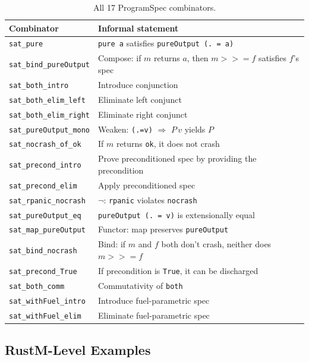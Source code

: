 \begin{table}[t]
\centering
\caption{All 17 ProgramSpec combinators.}
\label{tab:combinators}
\small
\begin{tabular}{@{}ll@{}}
\toprule
\textbf{Combinator} & \textbf{Informal statement} \\
\midrule
\texttt{sat\_pure}              & \texttt{pure a} satisfies \texttt{pureOutput (. = a)} \\
\texttt{sat\_bind\_pureOutput}  & Compose: if $m$ returns $a$, then $m >>= f$ satisfies $f$'s spec \\
\texttt{sat\_both\_intro}       & Introduce conjunction \\
\texttt{sat\_both\_elim\_left}  & Eliminate left conjunct \\
\texttt{sat\_both\_elim\_right} & Eliminate right conjunct \\
\texttt{sat\_pureOutput\_mono}  & Weaken: \texttt{(.=v)} $\Rightarrow$ $P\,v$ yields $P$ \\
\texttt{sat\_nocrash\_of\_ok}   & If $m$ returns \texttt{ok}, it does not crash \\
\texttt{sat\_precond\_intro}    & Prove preconditioned spec by providing the precondition \\
\texttt{sat\_precond\_elim}     & Apply preconditioned spec \\
\texttt{sat\_rpanic\_nocrash}   & $\neg$: \texttt{rpanic} violates \texttt{nocrash} \\
\texttt{sat\_pureOutput\_eq}    & \texttt{pureOutput (. = v)} is extensionally equal \\
\texttt{sat\_map\_pureOutput}   & Functor: map preserves \texttt{pureOutput} \\
\texttt{sat\_bind\_nocrash}     & Bind: if $m$ and $f$ both don't crash, neither does $m >>= f$ \\
\texttt{sat\_precond\_True}     & If precondition is \texttt{True}, it can be discharged \\
\texttt{sat\_both\_comm}        & Commutativity of \texttt{both} \\
\texttt{sat\_withFuel\_intro}   & Introduce fuel-parametric spec \\
\texttt{sat\_withFuel\_elim}    & Eliminate fuel-parametric spec \\
\bottomrule
\end{tabular}
\end{table}

\subsection{RustM-Level Examples}

